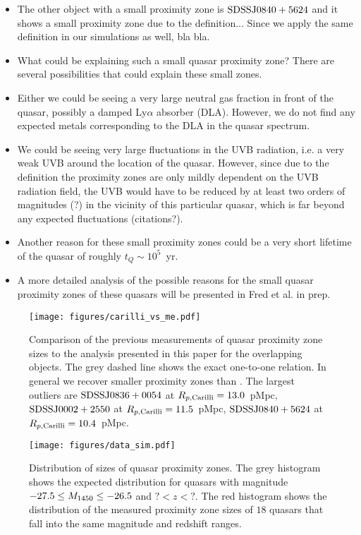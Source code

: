 \documentclass[iop]{emulateapj}
\newcommand{\lya} {Ly$\alpha$\xspace}
\begin{document}
\begin{itemize}
\item The other object with a small proximity zone is $\rm SDSS J0840+5624$ and it shows a small proximity zone due to the definition... Since we apply the same definition in our simulations as well, bla bla. 
\item What could be explaining such a small quasar proximity zone? There are several possibilities that could explain these small zones. 
\item Either we could be seeing a very large neutral gas fraction in front of the quasar, possibly a damped \lya absorber (DLA). However, we do not find any expected metals corresponding to the DLA in the quasar spectrum. 
\item We could be seeing very large fluctuations in the UVB radiation, i.e. a very weak UVB around the location of the quasar. However, since due to the definition the proximity zones are only mildly dependent on the UVB radiation field, the UVB would have to be reduced by at least two orders of magnitudes (?) in the vicinity of this particular quasar, which is far beyond any expected fluctuations (citations?). 
\item Another reason for these small proximity zones could be a very short lifetime of the quasar of roughly $t_Q\sim 10^5$~yr. 
\item A more detailed analysis of the possible reasons for the small quasar proximity zones of these quasars will be presented in Fred et al. in prep. 
\end{itemize}

\begin{figure}
\centering
\texttt{[image: figures/carilli\_vs\_me.pdf]}
\caption{Comparison of the previous measurements of quasar proximity zone sizes to the analysis presented in this paper for the overlapping objects. The grey dashed line shows the exact one-to-one relation. In general we recover smaller proximity zones than \citet{Carilli2010}. The largest outliers are $\rm SDSS J0836+0054$ at $R_{p, \rm Carilli} = 13.0$~pMpc, $\rm SDSS J0002+2550$ at $R_{p, \rm Carilli} = 11.5$~pMpc, $\rm SDSS J0840+5624$ at $R_{p, \rm Carilli} = 10.4$~pMpc. \label{fig:carilli}} 
\end{figure}

\begin{figure}
\centering
\texttt{[image: figures/data\_sim.pdf]}
\caption{Distribution of sizes of quasar proximity zones. The grey histogram shows the expected distribution for quasars with magnitude $-27.5\leq M_{\rm 1450}\leq -26.5$ and $?<z<?$. The red histogram shows the distribution of the measured proximity zone sizes of $18$ quasars that fall into the same magnitude and redshift ranges. \label{fig:comp_sim}} 
\end{figure}
\end{document}
